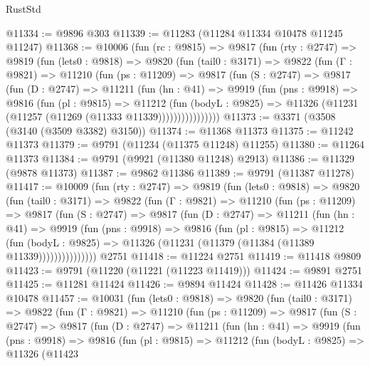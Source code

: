 \begin{lexlean}{RustStd}
\begin{coremodule}
@11334 := @9896 @303
@11339 := @11283 (@11284 @11334 @10478 @11245 @11247)
@11368 := @10006
    (fun (rc : @9815) =>
    @9817
      (fun (rty : @2747) =>
      @9819
        (fun (lets0 : @9818) =>
        @9820
          (fun (tail0 : @3171) =>
          @9822
            (fun (Γ : @9821) =>
            @11210
              (fun (ps : @11209) =>
              @9817
                (fun (S : @2747) =>
                @9817
                  (fun (D : @2747) =>
                  @11211
                    (fun (hn : @41) =>
                    @9919
                      (fun (pns : @9918) =>
                      @9816
                        (fun (pl : @9815) =>
                        @11212
                          (fun (bodyL : @9825) =>
                          @11326 (@11231 (@11257 (@11269 (@11333 @11339))))))))))))))))
@11373 := @3371 (@3508 (@3140 (@3509 @3382) @3150))
@11374 := @11368 @11373
@11375 := @11242 @11373
@11379 := @9791 (@11234 (@11375 @11248) @11255)
@11380 := @11264 @11373
@11384 := @9791 (@9921 (@11380 @11248) @2913)
@11386 := @11329 (@9878 @11373)
@11387 := @9862 @11386
@11389 := @9791 (@11387 @11278)
@11417 := @10009
    (fun (rty : @2747) =>
    @9819
      (fun (lets0 : @9818) =>
      @9820
        (fun (tail0 : @3171) =>
        @9822
          (fun (Γ : @9821) =>
          @11210
            (fun (ps : @11209) =>
            @9817
              (fun (S : @2747) =>
              @9817
                (fun (D : @2747) =>
                @11211
                  (fun (hn : @41) =>
                  @9919
                    (fun (pns : @9918) =>
                    @9816
                      (fun (pl : @9815) =>
                      @11212
                        (fun (bodyL : @9825) =>
                        @11326 (@11231 (@11379 (@11384 (@11389 @11339)))))))))))))))
    @2751
@11418 := @11224 @2751
@11419 := @11418 @9809
@11423 := @9791 (@11220 (@11221 (@11223 @11419)))
@11424 := @9891 @2751
@11425 := @11281 @11424
@11426 := @9894 @11424
@11428 := @11426 @11334 @10478
@11457 := @10031
    (fun (lets0 : @9818) =>
    @9820
      (fun (tail0 : @3171) =>
      @9822
        (fun (Γ : @9821) =>
        @11210
          (fun (ps : @11209) =>
          @9817
            (fun (S : @2747) =>
            @9817
              (fun (D : @2747) =>
              @11211
                (fun (hn : @41) =>
                @9919
                  (fun (pns : @9918) =>
                  @9816
                    (fun (pl : @9815) =>
                    @11212
                      (fun (bodyL : @9825) =>
                      @11326
                        (@11423

\end{coremodule}
\end{lexlean}
